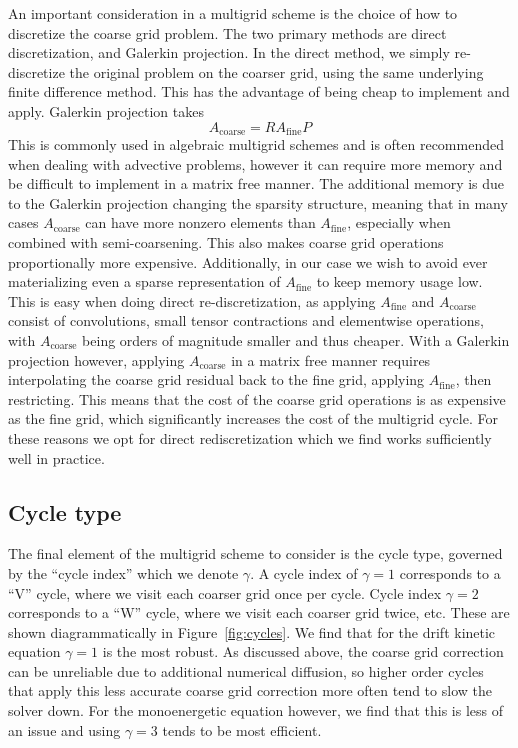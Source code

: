 \documentclass[11pt]{article}
\begin{document}
An important consideration in a multigrid scheme is the choice of how to
discretize the coarse grid problem. The two primary methods are direct
discretization, and Galerkin projection. In the direct method, we simply
re-discretize the original problem on the coarser grid, using the same
underlying finite difference method. This has the advantage of being cheap to
implement and apply. Galerkin projection takes
\begin{equation}
A_{\mathrm{coarse}} = R A_{\mathrm{fine}}P
\end{equation}
This is commonly used in algebraic multigrid schemes and is often recommended
when dealing with advective problems, however it can require more memory and be
difficult to implement in a matrix free manner. The additional memory is due to
the Galerkin projection changing the sparsity structure, meaning that in many
cases $A_{\mathrm{coarse}}$ can have more nonzero elements than $A_{\mathrm{fine}}$, especially
when combined with semi-coarsening. This also makes coarse grid operations
proportionally more expensive. Additionally, in our case we wish to avoid ever
materializing even a sparse representation of $A_{\mathrm{fine}}$ to keep memory usage
low. This is easy when doing direct re-discretization, as applying $A_{\mathrm{fine}}$
and $A_{\mathrm{coarse}}$ consist of convolutions, small tensor contractions and
elementwise operations, with $A_{\mathrm{coarse}}$ being orders of magnitude smaller and
thus cheaper. With a Galerkin projection however, applying $A_{\mathrm{coarse}}$ in a
matrix free manner requires interpolating the coarse grid residual back to the
fine grid, applying $A_{\mathrm{fine}}$, then restricting. This means that the cost of
the coarse grid operations is as expensive as the fine grid, which
significantly increases the cost of the multigrid cycle. For these reasons we
opt for direct rediscretization which we find works sufficiently well in
practice.

\subsection{Cycle type}
\label{sec:cycle-type}

The final element of the multigrid scheme to consider is the cycle type,
governed by the ``cycle index'' which we denote $\gamma$. A cycle index of $\gamma=1$
corresponds to a ``V''
cycle, where we visit each coarser grid once per cycle. Cycle index $\gamma=2$
corresponds to a ``W'' cycle, where we visit each coarser grid twice, etc. These
are shown diagrammatically in Figure~\ref{fig:cycles}. We find that for the
drift kinetic equation $\gamma=1$ is the most robust. As discussed above, the
coarse grid correction can be unreliable due to additional numerical diffusion,
so higher order cycles that apply this less accurate coarse grid correction more
often tend to slow the solver down. For the monoenergetic equation however, we
find that this is less of an issue and using $\gamma=3$ tends to be most
efficient.
\end{document}
